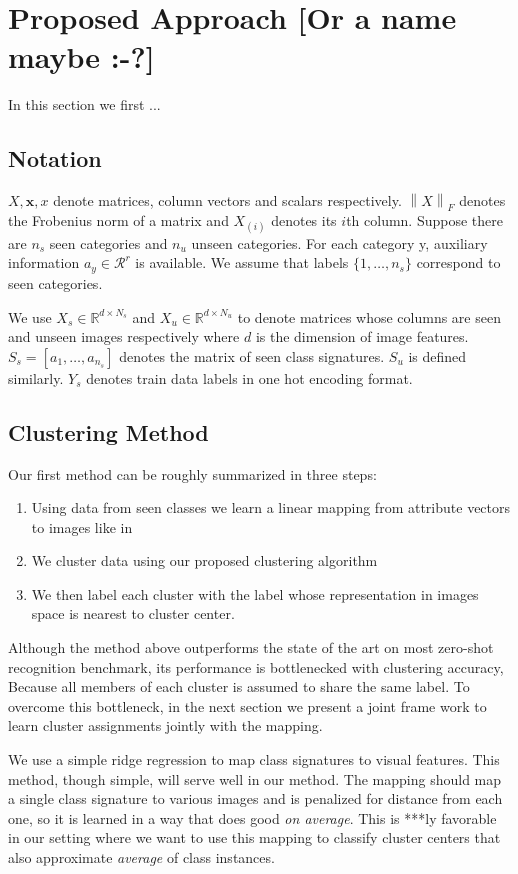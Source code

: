 \documentclass[wcp]{jmlr}
\newcommand{\norm}[1]{\left \lVert #1 \right \rVert_{F}}
\begin{document}
\section{Proposed Approach [Or a name maybe :-?]}
In this section we first ...


\subsection{Notation}
$X, \mathbf{x}, x$ denote matrices, column vectors and scalars respectively. $\norm{X}$ denotes the Frobenius norm of a matrix and
$X_{(i)}$ denotes its $i$th column.
Suppose there are $n_s$ seen categories and $n_u$ unseen categories. For each category y,
auxiliary information $a_y \in \mathcal{R}^r$ is available. We assume that labels $\{1, \ldots, n_s \}$
correspond to seen categories.

We use $X_s \in \mathbb{R}^{d \times N_s}$ and $X_u \in \mathbb{R}^{d \times N_u}$
to denote matrices whose columns are seen and unseen images respectively where $d$ is the dimension of image features.
$S_s = [a_1, \ldots, a_{n_s}]$ denotes the matrix of seen class signatures. $S_u$ is defined similarly. $Y_s$
denotes train data labels in one hot encoding format.

\subsection{Clustering Method}
Our first method can be roughly summarized in three steps:
\begin{enumerate}
  \item Using data from seen classes we learn a linear mapping from  attribute vectors to images like in \cite{Kodirov2015}
  \item We cluster data using our proposed clustering algorithm
  \item We then label each cluster with the label whose representation in images space is nearest to cluster center.
\end{enumerate}
 Although the method above outperforms the state of the art on most zero-shot recognition benchmark,
its performance is bottlenecked with clustering accuracy, Because all members of each cluster is assumed to
share the same label. To overcome this bottleneck, in the next section we
present a joint frame work to learn cluster assignments jointly with the mapping.

We use a simple ridge regression to map class signatures to visual features. This method, though simple,
will serve well in our method. The mapping should map a single class signature to various images and is penalized
for distance from each one, so it is learned in a way that does good \textit{on average}. This is ***ly
favorable in our setting where we want to use this mapping to classify cluster centers that also
approximate \textit{average} of class instances.
\end{document}
